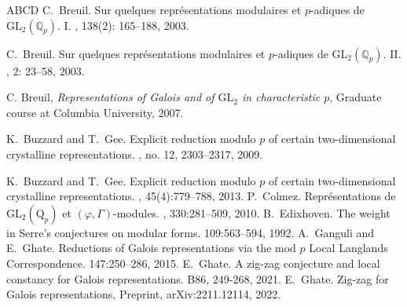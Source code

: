 \documentclass[11pt, reqno]{amsart}
\numberwithin{equation}{section}
\newcommand\GL{{\mathrm{GL}}}
\theoremstyle{definition}
\theoremstyle{remark}
\theoremstyle{definition}
\theoremstyle{remark}
\theoremstyle{remark}
\begin{document}
\begin{thebibliography}{ABCD}
C.~Breuil.
\newblock Sur quelques repr\'esentations modulaires et $p$-adiques de ${\mathrm {GL}}_2({\mathbb Q}_p)$. I.
, 138(2): 165--188, 2003.

\bibitem[B03b]{[Br03]}
C.~Breuil.
\newblock Sur quelques repr\'esentations modulaires et $p$-adiques de ${\mathrm {GL}}_2({\mathbb Q}_p)$. II.
, 2: 23--58, 2003.


C. Breuil, \emph{Representations of Galois and of $\GL_{2}$ in characteristic $p$},
Graduate course at Columbia University, 2007. 



\bibitem[BG09]{[BG09]}
K.~Buzzard and T.~Gee.
\newblock Explicit reduction modulo $p$ of certain two-dimensional crystalline representations.
, no. 12, 2303--2317, 2009.


K.~Buzzard and T.~Gee.
\newblock Explicit reduction modulo $p$ of certain two-dimensional crystalline representations.
, 45(4):779--788, 2013.
P.~Colmez.
\newblock Repr\'esentations de $\mathrm{GL}_2(\mathrm{Q}_p)$ et $(\varphi,\Gamma)$-modules. 
, 330:281--509, 2010. 
B.~Edixhoven.
\newblock  The weight in Serre's conjectures on modular forms.
 109:563--594, 1992.
\bibitem[GG15]{[GG15]}
A.~Ganguli and E.~Ghate.
\newblock Reductions of Galois representations via the mod $p$ Local Langlands Correspondence.
 147:250--286, 2015.
\bibitem[G21]{[G21]} E.~Ghate.
\newblock A zig-zag conjecture and local constancy for Galois representations. 
 B86, 249-268, 2021.
\bibitem[G22]{[G22]}
E.~Ghate.
\newblock Zig-zag for Galois representations, Preprint, arXiv:2211.12114, 2022.


\end{thebibliography}
\end{document}
